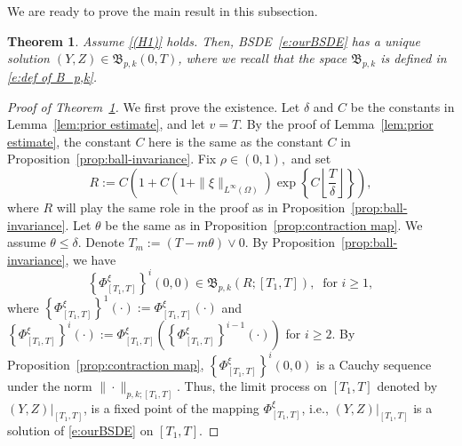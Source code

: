 \documentclass[11pt,reqno]{amsart}
\newtheorem{theorem}{Theorem}
\numberwithin{equation}{section}
\begin{document}
We are ready to prove the main result in this subsection. 			


\begin{theorem}\label{thm:picard}
Assume \ref{(H1)} holds.  Then, BSDE~\eqref{e:ourBSDE} has a unique solution $(Y,Z)\in \mathfrak B_{p,k}(0,T)$, where we recall that the space $\mathfrak B_{p,k}$ is defined in \eqref{e:def of B_p,k}. 
\end{theorem}

\begin{proof}[Proof of Theorem~\ref{thm:picard}]
\makeatletter{}\makeatother
\label{proof:1}
We first prove the existence. Let $\delta$ and $C$ be the constants in Lemma~\ref{lem:prior estimate}, and let $v = T$. By the proof of Lemma~\ref{lem:prior estimate}, the constant $C$ here is the same as the constant $C$ in Proposition~\ref{prop:ball-invariance}. Fix $\rho\in(0,1),$ and set
\[R := C\left(1 + C\left(1+\|\xi\|_{L^{\infty}(\Omega)}\right) \exp\left\{C\left\lfloor\frac{T}{\delta}\right\rfloor\right\} \right),\]
where $R$ will play the same role in the proof as in Proposition~\ref{prop:ball-invariance}. Let $\theta$ be the same as in Proposition~\ref{prop:contraction map}.  We assume $\theta\le \delta$. 
Denote $T_{m}:= (T-m\theta)\vee 0$. By Proposition~\ref{prop:ball-invariance}, we have 
\begin{equation*}
\left\{\Phi^{\xi}_{[T_{1},T]}\right\}^{i}\left(0,0\right)\in \mathfrak{B}_{p,k}\left(R;[T_{1},T]\right),~ \text{ for } i\ge 1,
\end{equation*}
where $\left\{\Phi^{\xi}_{[T_{1},T]}\right\}^{1}(\cdot) := \Phi^{\xi}_{[T_{1},T]}(\cdot)$ and $\left\{\Phi^{\xi}_{[T_{1},T]}\right\}^{i}(\cdot) := \Phi^{\xi}_{[T_{1},T]}\left(\left\{\Phi^{\xi}_{[T_{1},T]}\right\}^{i-1}(\cdot)\right)$ for $i \ge 2$. By Proposition~\ref{prop:contraction map}, $\left\{\Phi^{\xi}_{[T_{1},T]}\right\}^{i}\left(0,0\right) $ is a Cauchy sequence under the norm $\|\cdot\|_{p,k;[T_1, T]}$. Thus, the limit process on $[T_1, T]$ denoted by $(Y,Z)\big|_{[T_{1},T]}$, is a fixed point of the mapping  $\Phi^{\xi}_{[T_{1},T]}$, i.e.,  $(Y,Z)\big|_{[T_{1},T]}$ is a solution of \eqref{e:ourBSDE} on $[T_{1},T]$. 


\end{proof}
\end{document}
